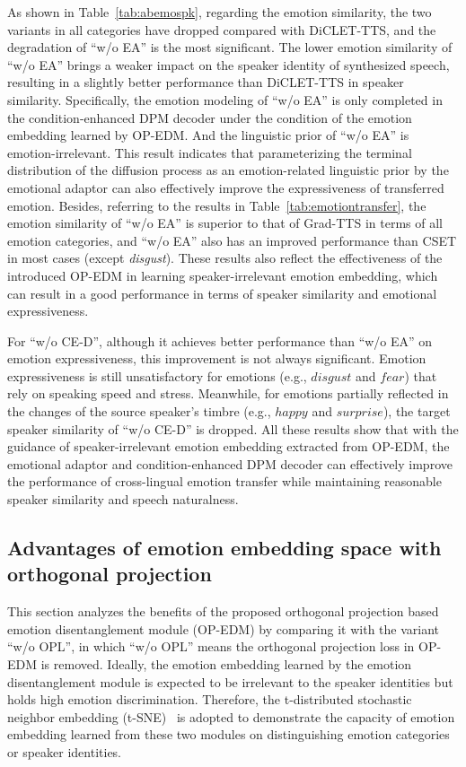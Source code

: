 \documentclass[journal,comsoc]{IEEEtran}
\begin{document}
As shown in Table~\ref{tab:abemospk}, regarding the emotion similarity, the two variants in all categories have dropped compared with DiCLET-TTS, and the degradation of ``w/o EA'' is the most significant. 
The lower emotion similarity of ``w/o EA'' brings a weaker impact on the speaker identity of synthesized speech, resulting in a slightly better performance than DiCLET-TTS in speaker similarity.
Specifically, the emotion modeling of ``w/o EA'' is only completed in the condition-enhanced DPM decoder under the condition of the emotion embedding learned by OP-EDM. 
And the linguistic prior of ``w/o EA'' is emotion-irrelevant.
This result indicates that parameterizing the terminal distribution of the diffusion process as an emotion-related linguistic prior by the emotional adaptor can also effectively improve the expressiveness of transferred emotion. 
Besides, referring to the results in Table~\ref{tab:emotiontransfer}, the emotion similarity of ``w/o EA'' is superior to that of Grad-TTS in terms of all emotion categories, and ``w/o EA'' also has an improved performance than CSET in most cases (except \textit{disgust}).
These results also reflect the effectiveness of the introduced OP-EDM in learning speaker-irrelevant emotion embedding, which can result in a good performance in terms of speaker similarity and emotional expressiveness.

For ``w/o CE-D'', although it achieves better performance than ``w/o EA'' on emotion expressiveness,
this improvement is not always significant.  
Emotion expressiveness is still unsatisfactory for emotions (e.g., $disgust$ and $fear$) that rely on speaking speed and stress. 
Meanwhile, for emotions partially reflected in the changes of the source speaker's timbre (e.g., $happy$ and $surprise$), the target speaker similarity of ``w/o CE-D'' is dropped.
All these results show that with the guidance of speaker-irrelevant emotion embedding extracted from OP-EDM, the emotional adaptor and condition-enhanced DPM decoder can effectively improve the performance of cross-lingual emotion transfer while maintaining reasonable speaker similarity and speech naturalness.

\vspace{-0.2cm}
\subsection{Advantages of emotion embedding space with orthogonal projection}

This section analyzes the benefits of the proposed orthogonal projection based emotion disentanglement module (OP-EDM) by comparing it with the variant ``w/o OPL'', in which ``w/o OPL'' means the orthogonal projection loss in OP-EDM is removed.
Ideally, the emotion embedding learned by the emotion disentanglement module is expected to be irrelevant to the speaker identities but holds high emotion discrimination.
Therefore, the t-distributed stochastic neighbor embedding (t-SNE)~\cite{Laurens2008Visualizing} is adopted to demonstrate the capacity of emotion embedding learned from these two modules on distinguishing emotion categories or speaker identities.
\end{document}
